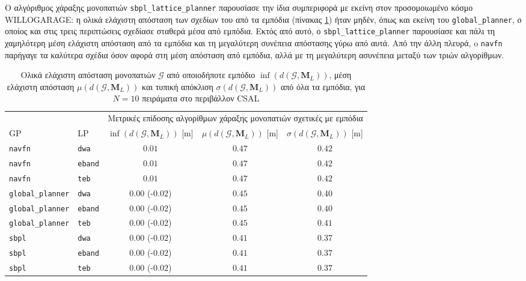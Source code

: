 Ο αλγόριθμος χάραξης μονοπατιών \texttt{sbpl\_lattice\_planner} παρουσίασε την
ίδια συμπεριφορά με εκείνη στον προσομοιωμένο κόσμο WILLOGARAGE: η ολικά
ελάχιστη απόσταση των σχεδίων του από τα εμπόδια (πίνακας
\ref{tbl:info_global_plan_map_csal}) ήταν μηδέν, όπως και εκείνη του
\texttt{global\_planner}, ο οποίος και στις τρεις περιπτώσεις σχεδίασε σταθερά
μέσα από εμπόδια. Εκτός από αυτό, ο \texttt{sbpl\_lattice\_planner} παρουσίασε
και πάλι τη χαμηλότερη μέση ελάχιστη απόσταση από τα εμπόδια και τη μεγαλύτερη
συνέπεια απόστασης γύρω από αυτά. Από την άλλη πλευρά, o \texttt{navfn}
παρήγαγε τα καλύτερα σχέδια όσον αφορά στη μέση απόσταση από εμπόδια, αλλά με τη
μεγαλύτερη ασυνέπεια μεταξύ των τριών αλγορίθμων.

\begin{table}[h]
\renewcommand{\arraystretch}{1.3}
\begin{tabular}{llccc}
  & & \multicolumn{3}{c}{Μετρικές επίδοσης αλγορίθμων χάραξης μονοπατιών σχετικές με εμπόδια} \\
  \cline{3-5}
  GP & LP & $\inf(d(\bm{\mathcal{G}},\bm{M}_L))$ [m] & $\mu(d(\bm{\mathcal{G}}, \bm{M}_L))$ [m] & $\sigma(d(\bm{\mathcal{G}},\bm{M}_L))$ [m] \\ \toprule
  \texttt{navfn} & \texttt{dwa} & $0.01$ & $0.47$ & $0.42$ \\
  \texttt{navfn} & \texttt{eband} & $0.01$ & $0.47$ & $0.42$ \\
  \texttt{navfn} & \texttt{teb} & $0.01$ & $0.47$ & $0.42$ \\
  \texttt{global\_planner} & \texttt{dwa} & \hspace{1.1cm} $0.00$ (-$0.02$) & $0.45$ & $0.40$ \\
  \texttt{global\_planner} & \texttt{eband} & \hspace{1.1cm} $0.00$ (-$0.02$) & $0.45$ & $0.40$ \\
  \texttt{global\_planner} & \texttt{teb} & \hspace{1.1cm} $0.00$ (-$0.02$) & $0.45$ & $0.41$ \\
  \texttt{sbpl} & \texttt{dwa} & \hspace{1.1cm} $0.00$ (-$0.02$) & $0.41$ & $0.37$ \\
  \texttt{sbpl} & \texttt{eband} & \hspace{1.1cm} $0.00$ (-$0.02$) & $0.41$ & $0.37$ \\
  \texttt{sbpl} & \texttt{teb} & \hspace{1.1cm} $0.00$ (-$0.02$) & $0.41$ & $0.37$ \\ \bottomrule
\end{tabular}
\caption{\small Ολικά ελάχιστη απόσταση μονοπατιών $\bm{\mathcal{G}}$ από
         οποιοδήποτε εμπόδιο $\inf(d(\bm{\mathcal{G}},\bm{M}_L))$, μέση
         ελάχιστη απόσταση $\mu(d(\bm{\mathcal{G}},\bm{M}_L))$ και τυπική
         απόκλιση $\sigma(d(\bm{\mathcal{G}},\bm{M}_L))$ από όλα τα εμπόδια,
         για $N=10$ πειράματα στο περιβάλλον CSAL}
\label{tbl:info_global_plan_map_csal}
\end{table}


